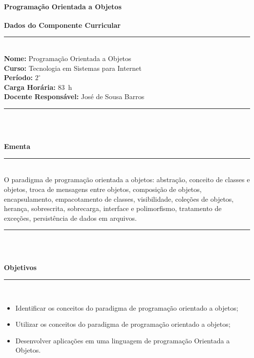 \paragraph{Programação Orientada a Objetos}

\begin{center}\textbf{Dados do Componente Curricular}\end{center}
\vspace{-5mm}
\noindent\rule{16.5cm}{0.4pt}
\\
\textbf{Nome:} Programação Orientada a Objetos
\\
\textbf{Curso:} Tecnologia em Sistemas para Internet
\\ 
\textbf{Período:} $2^{\circ}$ 
\\
\textbf{Carga Horária:} 83~h 
\\ 
\textbf{Docente Responsável:} José de Sousa Barros 
\\ 
\noindent\rule{16.5cm}{0.4pt}\\
\\
\vspace{-12mm}
\begin{center}\textbf{Ementa}\end{center}
\vspace{-5mm}
\noindent\rule{16.5cm}{0.4pt}
\\
O paradigma de programação orientada a objetos: abstração, conceito de classes e objetos, troca de mensagens entre objetos, composição de objetos, encapsulamento, empacotamento de classes, visibilidade, coleções de objetos, herança, sobrescrita, sobrecarga, interface e polimorfismo, tratamento de exceções, persistência de dados em arquivos. \\
\noindent\rule{16.5cm}{0.4pt}\\
\\
\vspace{-12mm}
\begin{center}\textbf{Objetivos}\end{center}
\vspace{-5mm}
\noindent\rule{16.5cm}{0.4pt}
\\
\begin{itemize}
\item Identificar os conceitos do paradigma de programação orientado a objetos;
\item Utilizar os conceitos do paradigma de programação orientado a objetos;
\item Desenvolver aplicações em uma linguagem de programação Orientada a Objetos.
\end{itemize}
